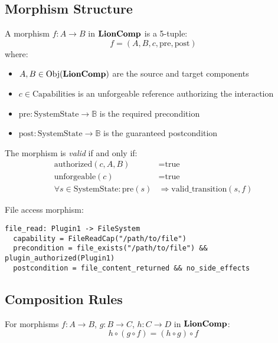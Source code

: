 \subsection{Morphism Structure}

\begin{definition}
A morphism $f: A \to B$ in $\mathbf{LionComp}$ is a 5-tuple:
\begin{equation}
f = (A, B, c, \text{pre}, \text{post})
\end{equation}
where:
\begin{itemize}
\item $A, B \in \mathrm{Obj}(\mathbf{LionComp})$ are the source and target components
\item $c \in \text{Capabilities}$ is an unforgeable reference authorizing the interaction
\item $\text{pre}: \text{SystemState} \to \mathbb{B}$ is the required precondition
\item $\text{post}: \text{SystemState} \to \mathbb{B}$ is the guaranteed postcondition
\end{itemize}

The morphism is \emph{valid} if and only if:
\begin{align}
\text{authorized}(c, A, B) &= \text{true} \\
\text{unforgeable}(c) &= \text{true} \\
\forall s \in \text{SystemState}: \text{pre}(s) &\Rightarrow \text{valid\_transition}(s, f)
\end{align}
\end{definition}

\begin{example}
File access morphism:
\begin{lstlisting}[style=rust]
file_read: Plugin1 -> FileSystem
  capability = FileReadCap("/path/to/file")
  precondition = file_exists("/path/to/file") && plugin_authorized(Plugin1)
  postcondition = file_content_returned && no_side_effects
\end{lstlisting}
\end{example}

\subsection{Composition Rules}

\begin{theorem}
\label{thm:associativity}
For morphisms $f: A \to B$, $g: B \to C$, $h: C \to D$ in $\mathbf{LionComp}$:
\begin{equation}
h \circ (g \circ f) = (h \circ g) \circ f
\end{equation}
\end{theorem}

